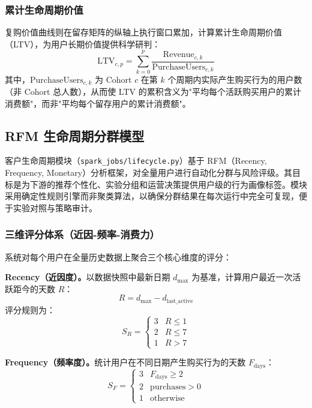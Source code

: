 \subsubsection{累计生命周期价值}

复购价值曲线则在留存矩阵的纵轴上执行窗口累加，计算累计生命周期价值（LTV），为用户长期价值提供科学研判：
\begin{equation}
    \text{LTV}_{c, p} = \sum_{k=0}^{p} \frac{\text{Revenue}_{c, k}}{\text{PurchaseUsers}_{c, k}}
\end{equation}
其中，$\text{PurchaseUsers}_{c, k}$ 为 Cohort $c$ 在第 $k$ 个周期内实际产生购买行为的用户数（非 Cohort 总人数），从而使 LTV 的累积含义为"平均每个活跃购买用户的累计消费额"，而非"平均每个留存用户的累计消费额"。

\subsection{RFM 生命周期分群模型}

客户生命周期模块（\texttt{spark\_jobs/lifecycle.py}）基于 RFM（Recency, Frequency, Monetary）分析框架，对全量用户进行自动化分群与风险评级。其目标是为下游的推荐个性化、实验分组和运营决策提供用户级的行为画像标签。模块采用确定性规则引擎而非聚类算法，以确保分群结果在每次运行中完全可复现，便于实验对照与策略审计。

\subsubsection{三维评分体系（近因-频率-消费力）}

系统对每个用户在全量历史数据上聚合三个核心维度的评分：

\textbf{Recency（近因度）。}以数据快照中最新日期 $d_{\max}$ 为基准，计算用户最近一次活跃距今的天数 $R$：
\begin{equation}
    R = d_{\max} - d_{\text{last\_active}}
    \label{eq:recency}
\end{equation}
评分规则为：
\begin{equation}
    S_R = \begin{cases} 3 & R \leq 1 \\ 2 & R \leq 7 \\ 1 & R > 7 \end{cases}
    \label{eq:recency-score}
\end{equation}

\textbf{Frequency（频率度）。}统计用户在不同日期产生购买行为的天数 $F_{\text{days}}$：
\begin{equation}
    S_F = \begin{cases} 3 & F_{\text{days}} \geq 2 \\ 2 & \text{purchases} > 0 \\ 1 & \text{otherwise} \end{cases}
    \label{eq:frequency-score}
\end{equation}

